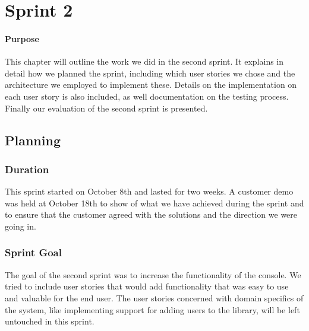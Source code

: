 \chapter{Sprint 2}

\minitoc

\subsubsection{Purpose}

This chapter will outline the work we did in the second sprint. It explains in detail how we planned the sprint, including which user stories we chose and the architecture we employed to implement these. Details on the implementation on each user story is also included, as well documentation on the testing process. Finally our evaluation of the second sprint is presented. 

\clearpage

\section{Planning}

\subsection{Duration}
This sprint started on October 8th and lasted for two weeks. A customer demo was held at October 18th to show of what we have achieved during the sprint and to ensure that the customer agreed with the solutions and the direction we were going in.

\subsection{Sprint Goal}
The goal of the second sprint was to increase the functionality of the console. We tried to include user stories that would add functionality that was easy to use and valuable for the end user. The user stories concerned with domain specifics of the system, like implementing support for adding users to the library, will be left untouched in this sprint.


